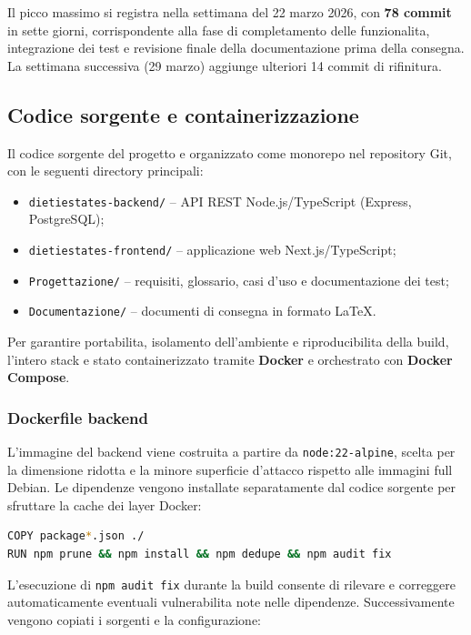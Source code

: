 \documentclass[a4paper,11pt]{article}
\begin{document}
Il picco massimo si registra nella settimana del 22 marzo 2026, con \textbf{78 commit} in sette giorni, corrispondente alla fase di completamento delle funzionalita, integrazione dei test e revisione finale della documentazione prima della consegna. La settimana successiva (29 marzo) aggiunge ulteriori 14 commit di rifinitura.

\subsection{Codice sorgente e containerizzazione}

Il codice sorgente del progetto e organizzato come monorepo nel repository Git, con le seguenti directory principali:
\begin{itemize}
  \item \texttt{dietiestates-backend/} -- API REST Node.js/TypeScript (Express, PostgreSQL);
  \item \texttt{dietiestates-frontend/} -- applicazione web Next.js/TypeScript;
  \item \texttt{Progettazione/} -- requisiti, glossario, casi d'uso e documentazione dei test;
  \item \texttt{Documentazione/} -- documenti di consegna in formato \LaTeX.
\end{itemize}

Per garantire portabilita, isolamento dell'ambiente e riproducibilita della build, l'intero stack e stato containerizzato tramite \textbf{Docker} e orchestrato con \textbf{Docker Compose}.

\subsubsection{Dockerfile backend}

L'immagine del backend viene costruita a partire da \texttt{node:22-alpine}, scelta per la dimensione ridotta e la minore superficie d'attacco rispetto alle immagini full Debian. Le dipendenze vengono installate separatamente dal codice sorgente per sfruttare la cache dei layer Docker:

\begin{lstlisting}[style=projectcode, language=bash]
COPY package*.json ./
RUN npm prune && npm install && npm dedupe && npm audit fix
\end{lstlisting}

L'esecuzione di \texttt{npm audit fix} durante la build consente di rilevare e correggere automaticamente eventuali vulnerabilita note nelle dipendenze. Successivamente vengono copiati i sorgenti e la configurazione:
\end{document}
